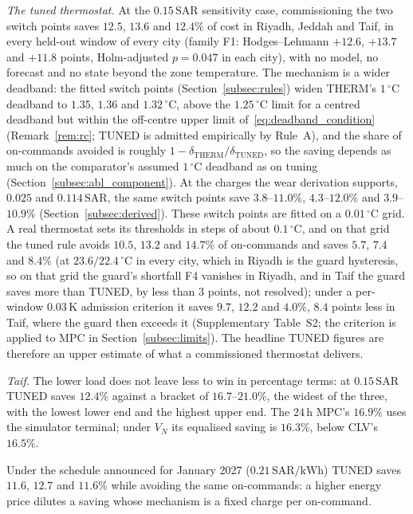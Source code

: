 \documentclass[3p,twocolumn,number]{elsarticle}
\newcommand{\SAR}{\text{SAR}}
\newcommand{\kWh}{\text{kWh}}
\begin{document}
\emph{The tuned thermostat.} At the $0.15\,\SAR$ sensitivity case, commissioning the two switch points saves $12.5$, $13.6$ and $12.4\%$ of cost in Riyadh, Jeddah and Taif, in every held-out window of every city (family F1: Hodges--Lehmann $+12.6$, $+13.7$ and $+11.8$ points, Holm-adjusted $p=0.047$ in each city), with no model, no forecast and no state beyond the zone temperature. The mechanism is a wider deadband: the fitted switch points (Section~\ref{subsec:rules}) widen THERM's $1\,^\circ$C deadband to $1.35$, $1.36$ and $1.32\,^\circ$C, above the $1.25\,^\circ$C limit for a centred deadband but within the off-centre upper limit of~\eqref{eq:deadband_condition} (Remark~\ref{rem:rc}; TUNED is admitted empirically by Rule~A), and the share of on-commands avoided is roughly $1-\delta_{\mathrm{THERM}}/\delta_{\mathrm{TUNED}}$, so the saving depends as much on the comparator's assumed $1\,^\circ$C deadband as on tuning (Section~\ref{subsec:abl_component}). At the charges the wear derivation supports, $0.025$ and $0.114\,\SAR$, the same switch points save $3.8$--$11.0\%$, $4.3$--$12.0\%$ and $3.9$--$10.9\%$ (Section~\ref{subsec:derived}). These switch points are fitted on a $0.01\,^\circ$C grid. A real thermostat sets its thresholds in steps of about $0.1\,^\circ$C, and on that grid the tuned rule avoids $10.5$, $13.2$ and $14.7\%$ of on-commands and saves $5.7$, $7.4$ and $8.4\%$ (at $23.6/22.4\,^\circ$C in every city, which in Riyadh is the guard hysteresis, so on that grid the guard's shortfall F4 vanishes in Riyadh, and in Taif the guard saves more than TUNED, by less than $3$ points, not resolved); under a per-window $0.03\,$K admission criterion it saves $9.7$, $12.2$ and $4.0\%$, $8.4$ points less in Taif, where the guard then exceeds it (Supplementary Table~S2; the criterion is applied to MPC in Section~\ref{subsec:limits}). The headline TUNED figures are therefore an upper estimate of what a commissioned thermostat delivers.

\emph{Taif.} The lower load does not leave less to win in percentage terms: at $0.15\,\SAR$ TUNED saves $12.4\%$ against a bracket of $16.7$--$21.0\%$, the widest of the three, with the lowest lower end and the highest upper end. The $24\,$h MPC's $16.9\%$ uses the simulator terminal; under $V_N$ its equalised saving is $16.3\%$, below CLV's $16.5\%$.

Under the schedule announced for January 2027 ($0.21\,\SAR/\kWh$) TUNED saves $11.6$, $12.7$ and $11.6\%$ while avoiding the same on-commands: a higher energy price dilutes a saving whose mechanism is a fixed charge per on-command.
\end{document}
